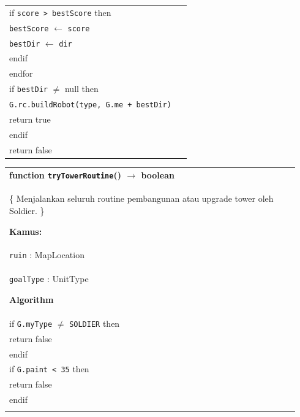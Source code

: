 \documentclass{article}
\newenvironment{pseudobox}
{
\centering
\begin{longtable}{|p{0.94\linewidth}|}
\hline
}
{
\\ \hline
\end{longtable}
\vspace{0.05cm}
}
\begin{document}
\begin{enumerate}[label=\alph*.]
\begin{enumerate}[label=\alph*.]
\begin{pseudobox}
\hspace*{3em}if \texttt{score > bestScore} then \\
\hspace*{4.5em}\texttt{bestScore} $\leftarrow$ \texttt{score} \\
\hspace*{4.5em}\texttt{bestDir} $\leftarrow$ \texttt{dir} \\
\hspace*{3em}endif \\
\hspace*{1.5em}endfor \\

\hspace*{1.5em}if \texttt{bestDir} $\neq$ null then \\
\hspace*{3em}\texttt{G.rc.buildRobot(type, G.me + bestDir)} \\
\hspace*{3em}return true \\
\hspace*{1.5em}endif \\

\hspace*{1.5em}return false
\end{pseudobox}

\begin{pseudobox}
\textbf{function \texttt{tryTowerRoutine}() $\rightarrow$ boolean} \\
\{ Menjalankan seluruh routine pembangunan atau upgrade tower oleh Soldier. \}

\textbf{Kamus:} \\
\hspace*{1.5em}\texttt{ruin} : MapLocation \\
\hspace*{1.5em}\texttt{goalType} : UnitType

\textbf{Algorithm} \\
\hspace*{1.5em}if \texttt{G.myType} $\neq$ \texttt{SOLDIER} then \\
\hspace*{3em}return false \\
\hspace*{1.5em}endif \\

\hspace*{1.5em}if \texttt{G.paint < 35} then \\
\hspace*{3em}return false \\
\hspace*{1.5em}endif \\


\end{pseudobox}
\end{enumerate}
\end{enumerate}
\end{document}
